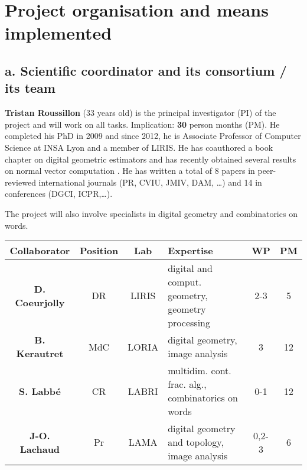 \section{Project organisation and means implemented}
\label{sec:org}

\subsection{a. Scientific coordinator and its consortium / its team}


\textbf{Tristan Roussillon} (33 years old) is the principal investigator (PI) of the project
and will work on all tasks. Implication: \textbf{30} person months (PM). 
He completed his PhD in 2009 and since 2012, he is Associate Professor of Computer Science at INSA Lyon
and a member of LIRIS. 
He has coauthored a book chapter on digital geometric estimators \cite{Coeurjolly2012} and
has recently obtained several results on normal vector computation \cite{LPRTCS2016,LPRDGCI2016,LPRJMIV2017}.    
He has written a total of 8 papers in peer-reviewed international journals (PR, CVIU, JMIV, DAM, \ldots) 
and 14 in conferences (DGCI, ICPR,\ldots).

The project will also involve specialists in digital geometry and combinatorics on words. 
\begin{table}[h]
\small
\centering
\begin{tabular}{|ccclcc|}
\hline
Collaborator & Position & Lab & Expertise & WP & PM \\ \hline
\hline
\textbf{D. Coeurjolly} & DR & LIRIS & digital and comput. geometry, geometry processing & 2-3 & 5 \\ \hline
\textbf{B. Kerautret} & MdC & LORIA & digital geometry, image analysis & 3 & 12 \\ \hline
\textbf{S. Labb\'{e}} & CR & LABRI & multidim. cont. frac. alg., combinatorics on words & 0-1 & 12 \\ \hline
\textbf{J-O. Lachaud} & Pr & LAMA & digital geometry and topology, image analysis & 0,2-3 & 6 \\ \hline
\hline
\end{tabular}
\normalsize
\end{table}

